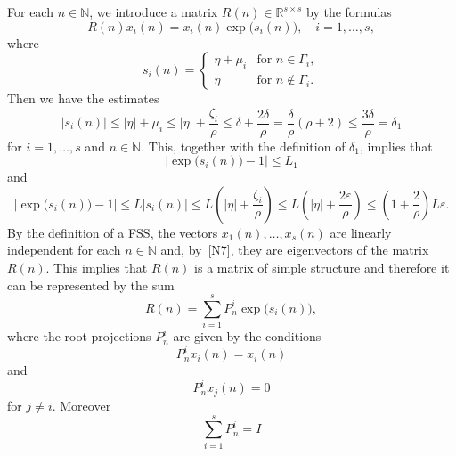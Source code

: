 \documentclass[10pt,a4paper]{amsart}
\theoremstyle{plain}
\begin{document}
For each $n\in \mathbb{N}$, we introduce a matrix $R(n)\in \mathbb{R}%
^{s\times s}$ by the formulas%
\begin{equation}
R(n)x_{i}( n) =x_{i}( n) \exp \bigl(s_{i}(
n) \bigr),\quad i=1,\dots ,s,  
\label{N7}
\end{equation}%
where 
\begin{equation*}
s_{i}( n) =
\begin{cases}
\eta +\mu _{i} & \textrm{for\ } n\in \Gamma _{i},\\
\eta & \textrm{for\ } n\not\in \Gamma _{i}.
\end{cases}
\end{equation*}%
Then we have the estimates%
\begin{equation*}
|s_{i}(n)|\le|\eta|+\mu_{i}\le|\eta| +\frac{\zeta_{i}}{\rho}\le
\delta+\frac{2\delta}{\rho}=\frac{\delta}{\rho}(\rho+2)\le\frac{3\delta}{\rho}=
\delta_{1}
\end{equation*}%
for $i=1,\dots ,s$ and $n\in \mathbb{N}$. This, together with the definition
of $\delta_{1}$, implies that 
\begin{equation*}
\bigl|\exp\bigl(s_{i}(n)\bigr)-1\bigr| \le L_{1}
\end{equation*}%
and 
\begin{equation*}
\bigl|\exp\bigl(s_{i}(n)\bigr)-1\bigr|\le
L\bigl| s_{i}( n) \bigr| \le 
L\left(|\eta|+\frac{\zeta_i}{\rho}\right)\le
L\left(|\eta|+\frac{2\varepsilon}{\rho}\right)\le
\left( 1+\frac{2}{\rho }%
\right) L\varepsilon.
\end{equation*}%
By the definition of 
a FSS, the vectors $x_{1}(n),\dots,x_{s}(n)$ are linearly independent for each $n\in \mathbb{N}$
and, by~\eqref{N7}, they are eigenvectors of the matrix $R(n)$. This implies
that $R(n)$ is a matrix of simple structure \cite[p.\,239, Proposition 2]{Lancaster} 
and therefore it can be represented by the sum%
\begin{equation*}
R(n)=\sum\limits_{i=1}^{s}P_{n}^{i}\exp\bigl(s_{i}(n)\bigr),
\end{equation*}%
where the root projections $P_{n}^{i}$ are given by the conditions%
\begin{equation*}
P_{n}^{i}x_{i}( n) =x_{i}( n)
\end{equation*}%
and%
\begin{equation*}
P_{n}^{i}x_{j}( n) =0
\end{equation*}%
for $j\neq i$. Moreover 
\begin{equation*}
\sum\limits_{i=1}^{s}P_{n}^{i}=I
\end{equation*}%
\end{document}
